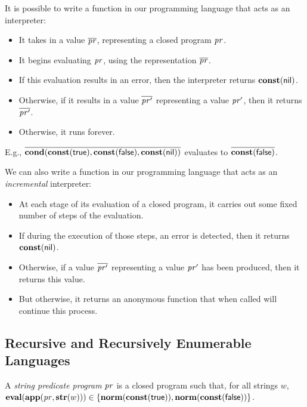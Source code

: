 It is possible to write a function in our programming language that
acts as an interpreter:
\begin{itemize}
\item It takes in a value $\overline{\mathit{pr}}$, representing a closed
  program $\mathit{pr}$.

\item It begins evaluating $\mathit{pr}$, using the representation
  $\overline{\mathit{pr}}$.

\item If this evaluation results in an error, then the interpreter
  returns $\mathbf{const}(\mathsf{nil})$.

\item Otherwise, if it results in a value $\overline{\mathit{pr}'}$
  representing a value $\mathit{pr}'$, then it returns $\overline{\mathit{pr}'}$.

\item Otherwise, it runs forever.
\end{itemize}

E.g.,
  $\overline{\mathbf{cond}(\mathbf{const}(\mathsf{true}),\mathbf{const}(\mathsf{false}),
    \mathbf{const}(\mathsf{nil}))}$ evaluates to $\overline{\mathbf{const}(\mathsf{false})}$.

We can also write a function in our programming language that acts as
an \emph{incremental} interpreter:
\begin{itemize}
\item At each stage of its evaluation of a closed program, it carries
  out some fixed number of steps of the evaluation.

\item If during the execution of those steps, an error is detected,
  then it returns $\mathbf{const}(\mathsf{nil})$.

\item Otherwise, if a value $\overline{\mathit{pr}'}$ representing a value
  $\mathit{pr}'$ has been produced, then it returns this value.

\item But otherwise, it returns an anonymous function that when called
  will continue this process.
\end{itemize}

\subsection{Recursive and Recursively Enumerable Languages}

A \emph{string predicate program} $\mathit{pr}$ is a closed program such that, for
all strings $w$, $\mathbf{eval}(\mathbf{app}(\mathit{pr},\mathbf{str}(w)))\in
\{\mathbf{norm}(\mathbf{const}(\mathsf{true})),\mathbf{norm}(\mathbf{const}(\mathsf{false}))\}$.

